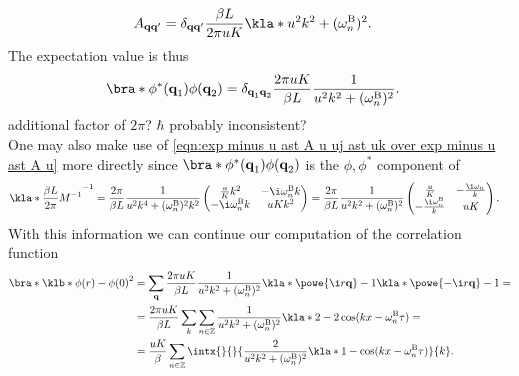 \documentclass[english, parskip=full]{scrartcl}
\newcommand{\B}{\text{B}}
\newcommand{\TODO}[1]{\color{red!60!black} #1\color{black}}
\begin{document}
\begin{align}
A_{\textbf{q}\textbf{q}'} &= \delta_{\textbf{q}\textbf{q}'} \frac{\beta L}{2\pi uK} \kla*{u^2k^2 + (\omega_n^\B)^2}.
\end{align}
The expectation value is thus
\begin{align}
\bra*{\phi^\ast(\textbf{q}_1) \phi(\textbf{q}_2)} &= \delta_{\textbf{q}_1 \textbf{q}_2} \frac{2\pi uK}{\beta L} \frac{1}{u^2k^2 + (\omega_n^\B)^2}.
\end{align}
\TODO{additional factor of $2\pi$? $\hbar$ probably inconsistent?}\\
One may also make use of \autoref{eqn:exp minus u ast A u uj ast uk over exp minus u ast A u} more directly since $\bra*{\phi^\ast(\textbf{q}_1) \phi(\textbf{q}_2)}$ is the $\phi,\phi^\ast$ component of
\begin{align}
\kla*{\frac{\beta L}{2\pi} M^{-1}}^{-1} &= \frac{2\pi}{\beta L} \frac{1}{u^2 k^4 + (\omega_n^\B)^2 k^2 } \begin{pmatrix}
\frac{u}{K} k^2 & -\i\omega_n^\B k \\ -\i\omega_n^\B k & uKk^2
\end{pmatrix} = \frac{2\pi}{\beta L} \frac{1}{u^2k^2 + (\omega_n^\B)^2} \begin{pmatrix}
\frac{u}{K} & -\frac{\i\omega_n}{k} \\ -\frac{\i\omega_n^\B}{k} & uK
\end{pmatrix}. \label{eqn:M inverse k-correlations}
\end{align}
With this information we can continue our computation of the correlation function
\begin{align}
\bra*{\klb*{\phi(r) - \phi(0)}^2} &= \sum_{\textbf{q}} \frac{2\pi uK}{\beta L} \frac{1}{u^2k^2 + (\omega_n^\B)^2} \kla*{\powe{\i r\textbf{q}} - 1} \kla*{\powe{-\i r\textbf{q}} - 1} = \\
&= \frac{2\pi uK}{\beta L} \sum_k \sum_{n\in\mathbb{Z}} \frac{1}{u^2k^2 + (\omega_n^\B)^2} \kla*{2 - 2 \cos (kx - \omega_n^\B \tau)} = \\
&= \frac{uK}{\beta} \sum_{n\in\mathbb{Z}} \intx{}{}{\frac{2}{u^2k^2 + (\omega_n^\B)^2} \kla*{1 - \cos(kx - \omega_n^\B\tau)} }{k}.
\end{align}
\end{document}
